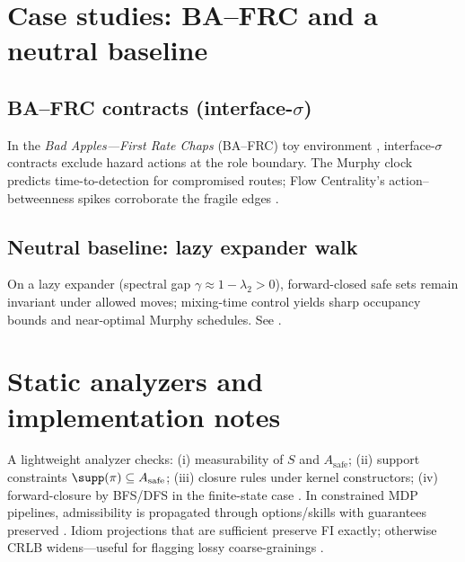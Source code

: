 \documentclass[11pt]{article}
\theoremstyle{plain}
\theoremstyle{definition}
\theoremstyle{remark}
\newcommand{\1}{\mathbbm{1}}
\begin{document}
\section{Case studies: BA--FRC and a neutral baseline}\label{sec:cases}
\subsection{BA--FRC contracts (interface-\texorpdfstring{$\sigma$}{sigma})}
In the \emph{Bad Apples—First Rate Chaps} (BA--FRC) toy environment \parencite{elliott2025bafrc}, interface-\(\sigma\) contracts exclude hazard actions at the role boundary. The Murphy clock predicts time-to-detection for compromised routes; Flow Centrality’s action–betweenness spikes corroborate the fragile edges \parencite{elliott2025flow,Freeman1977,Newman2005}.

\subsection{Neutral baseline: lazy expander walk}
On a lazy expander (spectral gap \(\gamma\approx 1-\lambda_2>0\)), forward-closed safe sets remain invariant under allowed moves; mixing-time control yields sharp occupancy bounds and near-optimal Murphy schedules. See \parencite{HooryLinialWigderson2006,LevinPeresWilmer2009}.

\section{Static analyzers and implementation notes}\label{sec:impl}
A lightweight analyzer checks: (i) measurability of \(S\) and \(A_{\mathrm{safe}}\); (ii) support constraints \(\supp(\pi)\subseteq A_{\mathrm{safe}}\); (iii) closure rules under kernel constructors; (iv) forward-closure by BFS/DFS in the finite-state case \parencite{Cormen2009}. In constrained MDP pipelines, admissibility is propagated through options/skills with guarantees preserved \parencite{Puterman1994,Altman1999}. Idiom projections that are sufficient preserve FI exactly; otherwise CRLB widens—useful for flagging lossy coarse-grainings \parencite{Blackwell1953,AmariNagaoka2000,Cencov1982,elliott2025idiom}.
\end{document}
